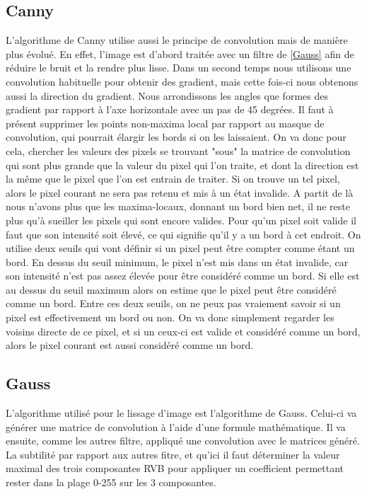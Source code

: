 \documentclass[twoside,openright,a4paper,11pt,french]{article}
\begin{document}
\subsection{Canny}
L'algorithme de Canny utilise aussi le principe de convolution mais de manière plus évolué.
En effet, l'image est d'abord traitée avec un filtre de \ref{Gauss} afin de réduire le bruit et
la rendre plus lisse.
Dans un second temps nous utilisons une convolution habituelle pour obtenir des gradient, mais cette fois-ci
nous obtenons aussi la direction du gradient. Nous arrondissons les angles que formes des gradient par rapport
à l'axe horizontale avec un pas de 45 degrées.
Il faut à présent supprimer les points non-maxima local par rapport au masque de convolution, qui pourrait
élargir les bords si on les laissaient. On va donc pour cela, chercher les valeurs des pixels se trouvant "sous"
la matrice de convolution qui sont plus grande que la valeur du pixel qui l'on traite, et dont la direction est
la même que le pixel que l'on est entrain de traiter. Si on trouve un tel pixel, alors le pixel courant ne 
sera pas retenu et mis à un état invalide.
A partit de là nous n'avons plus que les maxima-locaux, donnant un bord bien net, il ne reste plus
qu'à sueiller les pixels qui sont encore valides. Pour qu'un pixel soit valide il faut que son intensité soit
élevé, ce qui signifie qu'il y a un bord à cet endroit. On utilise deux seuils qui vont définir si un pixel
peut être compter comme étant un bord. En dessus du seuil minimum, le pixel n'est mis dans un état invalide,
car son intensité n'est pas assez élevée pour être considéré comme un bord. Si elle est au dessus du seuil
maximum alors on estime que le pixel peut être considéré comme un bord. Entre ces deux seuils, on ne peux pas
vraiement savoir si un pixel est effectivement un bord ou non. On va donc simplement regarder les voisins directe
de ce pixel, et si un ceux-ci est valide et considéré comme un bord, alors le pixel courant est aussi considéré
comme un bord.

\subsection{Gauss}
\label{sec:gauss}
L'algorithme utilisé pour le lissage d'image est l'algorithme de Gauss. Celui-ci va générer une
matrice de convolution à l'aide d'une formule mathématique. Il va ensuite, comme les autres filtre,
appliqué une convolution avec le matrices généré. La subtilité par rapport aux autres fitre, et qu'ici
il faut déterminer la valeur maximal des trois composantes RVB pour appliquer un coefficient
permettant rester dans la plage 0-255 sur les 3 composantes.
\end{document}
